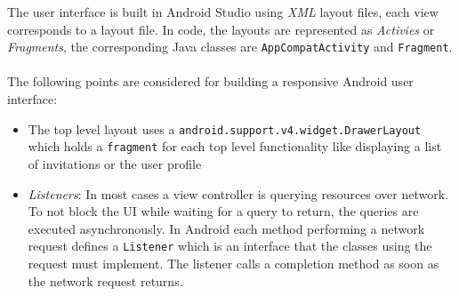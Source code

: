 \documentclass[12pt]{scrartcl}
\begin{document}
The user interface is built in Android Studio using \emph{XML} layout files, each view corresponds to a layout file. In code, the layouts are represented as \emph{Activies} or \emph{Fragments}, the corresponding Java classes are \texttt{AppCompatActivity} and \texttt{Fragment}. \\
\\
The following points are considered for building a responsive Android user interface:
\begin{itemize}
	\item The top level layout uses a \texttt{android.support.v4.widget.DrawerLayout} which holds a \texttt{fragment} for each top level functionality like displaying a list of invitations or the user profile
	
	\item \emph{Listeners}: In most cases a view controller is querying resources over network. To not block the UI while waiting for a query to return, the queries are executed asynchronously. In Android each method performing a network request defines a \texttt{Listener} which is an interface that the classes using the request must implement. The listener calls a completion method as soon as the network request returns.
	
\end{itemize}
\end{document}
